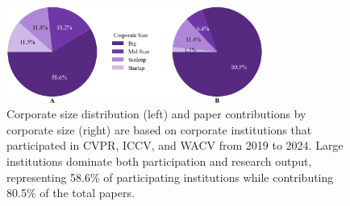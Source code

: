 \documentclass{article}
\begin{document}
\begin{figure}[ht]
  \centering
  \includegraphics[width=0.75\textwidth]{report/images/pie_charts.png}  
  \caption{Corporate size distribution (left) and paper contributions by corporate size (right) are based on corporate institutions that participated in CVPR, ICCV, and WACV from 2019 to 2024. Large institutions dominate both participation and research output, representing 58.6\% of participating institutions while contributing 80.5\% of the total papers.}
  \vspace{-10pt}
  \label{fig:corporate_size_graph}
\end{figure}

\vspace{-10pt}
\end{document}
